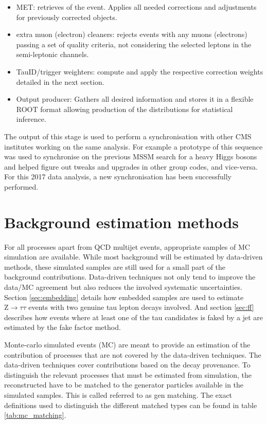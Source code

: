 \begin{itemize}
    \item MET: retrieves \MET of the event. Applies all needed corrections and adjustments for previously corrected objects.
    \item extra muon (electron) cleaners: rejects events with any muons (electrons) passing a set of quality criteria, not considering the selected leptons in the semi-leptonic channels.
    \item TauID/trigger weighters: compute and apply the respective correction weights detailed in the next section.
    \item Output producer: Gathers all desired information and stores it in a flexible ROOT format allowing production of the distributions for statistical inference.
\end{itemize}

The output of this stage is used to perform a synchronisation with other CMS institutes working on the same analysis. For example a prototype of this sequence was used to synchronise on the previous MSSM search for a heavy Higgs bosons \cite{Aaboud2018} and helped figure out tweaks and upgrades in other group codes, and vice-versa. For this 2017 data analysis, a new synchronisation has been successfully performed.


\section{Background estimation methods}
\label{sec:analysis_background_methods}

For all processes apart from QCD multijet events, appropriate samples of MC simulation are available. While most background will be estimated by data-driven methods, these simulated samples are still used for a small part of the background contributions. Data-driven techniques not only tend to improve the data/MC agreement but also reduces the involved systematic uncertainties. Section \ref{sec:embedding} details how embedded samples are used to estimate $\mathrm{Z} \rightarrow \tau\tau$ events with two genuine tau lepton decays involved. And section \ref{sec:ff} describes how events where at least one of the tau candidates is faked by a jet are estimated by the fake factor method.

Monte-carlo simulated events (MC) are meant to provide an estimation of the contribution of processes that are not covered by the data-driven techniques. The data-driven techniques cover contributions based on the \tauh decay provenance. To distinguish the relevant processes that must be estimated from simulation, the reconstructed \tauh have to be matched to the generator particles available in the simulated samples. This is called referred to as gen matching. The exact definitions used to distinguish the different matched types can be found in table \ref{tab:mc_matching}.

